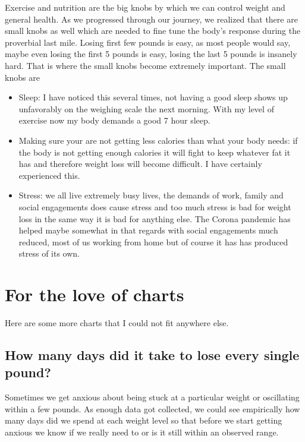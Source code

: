 \documentclass[
  oneside]{book}
\begin{document}
Exercise and nutrition are the big knobs by which we can control weight and general health. As we progressed through our journey, we realized that there are small knobs as well which are needed to fine tune the body's response during the proverbial last mile. Losing first few pounds is easy, as most people would say, maybe even losing the first 5 pounds is easy, losing the last 5 pounds is insanely hard. That is where the small knobs become extremely important. The small knobs are

\begin{itemize}
\item
  Sleep: I have noticed this several times, not having a good sleep shows up unfavorably on the weighing scale the next morning. With my level of exercise now my body demands a good 7 hour sleep.
\item
  Making sure your are not getting less calories than what your body needs: if the body is not getting enough calories it will fight to keep whatever fat it has and therefore weight loss will become difficult. I have certainly experienced this.
\item
  Stress: we all live extremely busy lives, the demands of work, family and social engagements does cause stress and too much stress is bad for weight loss in the same way it is bad for anything else. The Corona pandemic has helped maybe somewhat in that regards with social engagements much reduced, most of us working from home but of course it has has produced stress of its own.
\end{itemize}

\hypertarget{for-the-love-of-charts}{%
\section{For the love of charts}\label{for-the-love-of-charts}}

Here are some more charts that I could not fit anywhere else.

\hypertarget{how-many-days-did-it-take-to-lose-every-single-pound}{%
\subsection{How many days did it take to lose every single pound?}\label{how-many-days-did-it-take-to-lose-every-single-pound}}

Sometimes we get anxious about being stuck at a particular weight or oscillating within a few pounds. As enough data got collected, we could see empirically how many days did we spend at each weight level so that before we start getting anxious we know if we really need to or is it still within an observed range.
\end{document}
